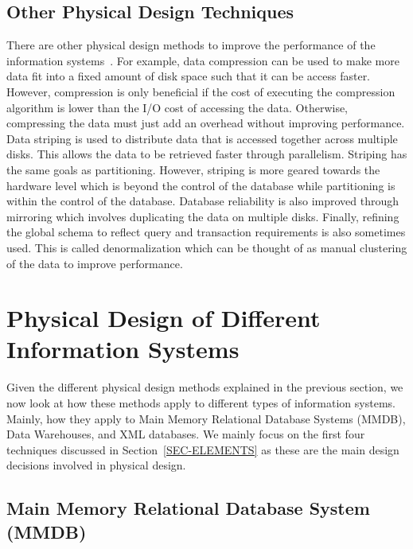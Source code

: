 \documentclass[12pt,a4paper]{article}
\begin{document}
\subsection{Other Physical Design Techniques}

There are other physical design methods to improve the performance of the information systems~\cite{lightstone2007physical}. For example, data compression can
be used to make more data fit into a fixed amount of disk space such that it can be access faster. However, compression is only beneficial if the cost of
executing the compression algorithm is lower than the I/O cost of accessing the data. Otherwise, compressing the data must just add an overhead without
improving performance. Data striping is used to distribute data that is accessed together across multiple disks. This allows the data
to be retrieved faster through parallelism. Striping has the same goals as partitioning. However, striping is more geared towards the hardware level
which is beyond the control of the database while partitioning is within the control of the database. Database reliability is also improved through mirroring
which involves duplicating the data on multiple disks. Finally, refining the global schema to reflect query and transaction requirements is also sometimes used.
This is called denormalization which can be thought of as manual clustering of the data to improve performance.

\section{Physical Design of Different Information Systems}
\label{SEC-DIFFSYS}

Given the different physical design methods explained in the previous section, we now look at how these methods apply to different types of information systems.
Mainly, how they apply to Main Memory Relational Database Systems (MMDB), Data Warehouses, and XML databases. We mainly focus
on the first four techniques discussed in Section~\ref{SEC-ELEMENTS} as these are the main design decisions involved in physical design.

\subsection{Main Memory Relational Database System (MMDB)}
\label{SEC-MMDB}
\end{document}
